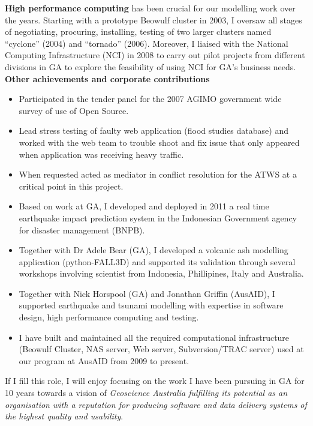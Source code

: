 \documentclass[10pt,a4paper]{article}
\begin{document}
\noindent \textbf{High performance computing} has been crucial for our modelling work over the years. Starting with a prototype Beowulf cluster in 2003, I oversaw all stages of negotiating, procuring, installing, testing of two larger clusters named ``cyclone'' (2004) and ``tornado'' (2006). Moreover, I liaised with the National Computing Infrastructure (NCI) in 2008 to carry out pilot projects from different divisions in GA to explore the feasibility of using NCI for GA's business needs.\\

\noindent \textbf{Other achievements and corporate contributions}
\begin{itemize}
    \item Participated in the tender panel for the 2007 AGIMO government wide survey of use of Open Source.
    \item Lead stress testing of faulty web application (flood studies database) and worked with the web team to trouble shoot and fix issue that only appeared when application was receiving heavy traffic.
    \item When requested acted as mediator in conflict resolution for the ATWS at a critical point in this project.
    \item Based on work at GA, I developed and deployed in 2011 a real time earthquake impact prediction system in the Indonesian Government agency for disaster management (BNPB).
    \item Together with Dr Adele Bear (GA), I developed a volcanic ash modelling application (python-FALL3D) and supported its validation through several workshops involving scientist from Indonesia, Phillipines, Italy and Australia.
    \item Together with Nick Horspool (GA) and Jonathan Griffin (AusAID), I supported earthquake and tsunami modelling with expertise in software design, high performance computing and testing.
    \item I have built and maintained all the required computational infrastructure (Beowulf Cluster, NAS server, Web server, Subversion/TRAC server) used at our program at AusAID from 2009 to present.
\end{itemize}

If I fill this role, I will enjoy focusing on the work I have been pursuing in GA for 10 years towards a vision of \emph{Geoscience Australia fulfilling its potential as an organisation with a reputation for producing software and data delivery systems of the highest quality and usability}.
\end{document}
